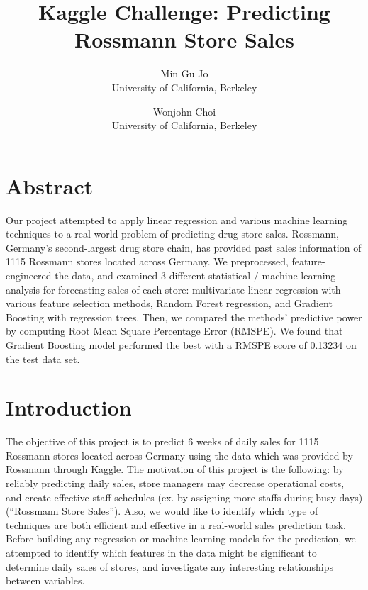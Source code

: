\documentclass[letterpaper,twocolumn,11pt]{article}
\begin{document}
\date{}

\title{\Large \bf Kaggle Challenge: Predicting Rossmann Store Sales}

\author{
  {\rm Min Gu Jo}\\
  University of California, Berkeley
  \and
      {\rm Wonjohn Choi}\\
      University of California, Berkeley
} %

\maketitle

\thispagestyle{empty}


\section{Abstract}
Our project attempted to apply linear regression and various machine learning techniques to a real-world problem of predicting drug store sales. Rossmann, Germany's second-largest drug store chain, has provided past sales information of 1115 Rossmann stores located across Germany. We preprocessed, feature-engineered the data, and examined 3 different statistical / machine learning analysis for forecasting sales of each store: multivariate linear regression with various feature selection methods, Random Forest regression, and Gradient Boosting with regression trees. Then, we compared the methods' predictive power by computing Root Mean Square Percentage Error (RMSPE). We found that Gradient Boosting model performed the best with a RMSPE score of 0.13234 on the test data set.

\section{Introduction}
The objective of this project is to predict 6 weeks of daily sales for 1115 Rossmann stores located across Germany using the data which was provided by Rossmann through Kaggle. The motivation of this project is the following: by reliably predicting daily sales, store managers may decrease operational costs, and create effective staff schedules (ex. by assigning more staffs during busy days) (``Rossmann Store Sales''). Also, we would like to identify which type of techniques are both efficient and effective in a real-world sales prediction task. Before building any regression or machine learning models for the prediction, we attempted to identify which features in the data might be significant to determine daily sales of stores, and investigate any interesting relationships between variables.
\end{document}
